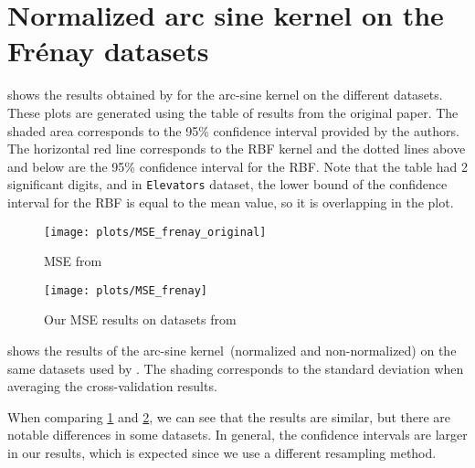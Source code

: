 
\section{Normalized arc sine kernel on the Frénay datasets}

 shows the results obtained by
\textcite{frenayParameterinsensitiveKernelExtreme2011} for the arc-sine kernel
on the different datasets. These plots are generated using the table of results
from the original paper. The shaded area corresponds to the 95\% confidence
interval provided by the authors. The horizontal red line corresponds to the RBF kernel and
the dotted lines above and below are the 95\% confidence interval for the RBF.
Note that the table had 2 significant digits, and in \texttt{Elevators} dataset, the
lower bound of the confidence interval for the RBF is equal to the mean value,
so it is overlapping in the plot.

\begin{figure}[H]
    \texttt{[image: plots/MSE\_frenay\_original]}
    \caption{MSE from \cite{frenayParameterinsensitiveKernelExtreme2011}}
    \label{fig:mse-frenay-original}
\end{figure}

\begin{figure}[H]
    \texttt{[image: plots/MSE\_frenay]}
    \caption{Our MSE results on datasets from \cite{frenayParameterinsensitiveKernelExtreme2011}}
    \label{fig:mse-frenay}
\end{figure}

 shows the results of the arc-sine
kernel~(normalized and non-normalized) on the same datasets used by \textcite{frenayParameterinsensitiveKernelExtreme2011}. The shading corresponds to the standard deviation when averaging the
cross-validation results.

When comparing \cref{fig:mse-frenay-original} and \cref{fig:mse-frenay}, we
can see that the results are similar, but there are notable differences in some
datasets. In general, the confidence intervals are larger in our results, which
is expected since we use a different resampling method.

